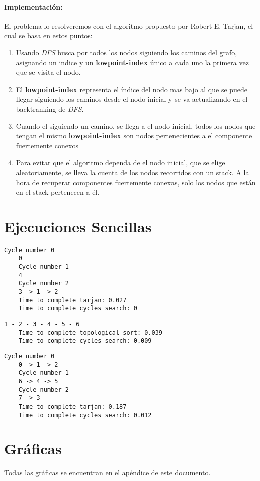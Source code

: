 \documentclass{article}
\begin{document}
\paragraph{Implementación:} El problema lo resolveremos con el algoritmo propuesto por Robert E. Tarjan\cite{tarjan}, el cual se basa en estos puntos:
\begin{enumerate}
	\item Usando \textit{DFS} busca por todos los nodos siguiendo los caminos del grafo, asignando un indice y un \textbf{lowpoint-index} único a cada uno la primera vez que se visita el nodo.
	\item El \textbf{lowpoint-index} representa el índice del nodo mas bajo al que se puede llegar siguiendo los caminos desde el nodo inicial y se va actualizando en el backtranking de
\textit{DFS}.
	\item Cuando el siguiendo un camino, se llega a el nodo inicial, todos los nodos que tengan el mismo \textbf{lowpoint-index} son nodos pertenecientes a el componente fuertemente conexos
	\item Para evitar que el algoritmo dependa de el nodo inicial, que se elige aleatoriamente, se lleva la cuenta de los nodos recorridos con un stack. A la hora de recuperar componentes fuertemente conexas,
solo los nodos que están en el stack pertenecen a él.
\end{enumerate}
\section{Ejecuciones Sencillas}
\begin{lstlisting}[caption=resources/graph1.txt, frame=shadowbox]
	Cycle number 0
	0
	Cycle number 1
	4
	Cycle number 2
	3 -> 1 -> 2
	Time to complete tarjan: 0.027
	Time to complete cycles search: 0
\end{lstlisting}

\begin{lstlisting}[caption=resources/graph2.txt, frame=shadowbox]
	1 - 2 - 3 - 4 - 5 - 6
	Time to complete topological sort: 0.039
	Time to complete cycles search: 0.009
\end{lstlisting}

\begin{lstlisting}[caption=resources/graph3.txt, frame=shadowbox]
	Cycle number 0
	0 -> 1 -> 2
	Cycle number 1
	6 -> 4 -> 5
	Cycle number 2
	7 -> 3
	Time to complete tarjan: 0.187
	Time to complete cycles search: 0.012
\end{lstlisting}
\section{Gráficas}\label{graphs}
Todas las gráficas se encuentran en el apéndice de este documento.
\end{document}
